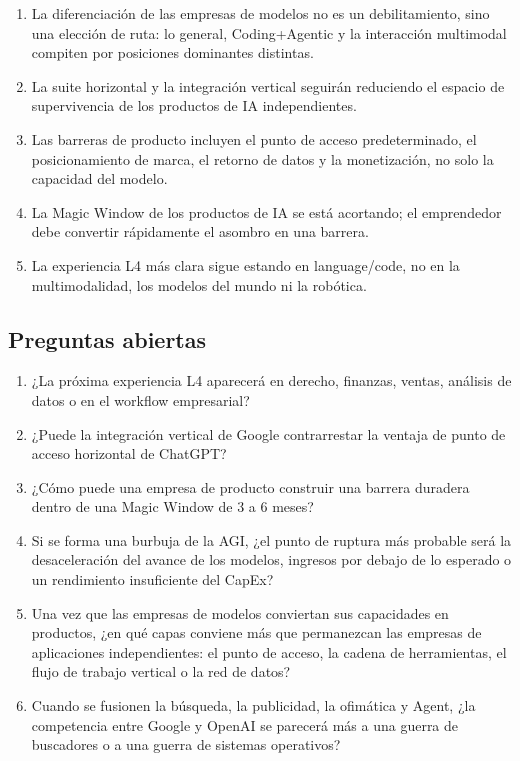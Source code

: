 \begin{enumerate}
\item La diferenciación de las empresas de modelos no es un debilitamiento, sino una elección de ruta: lo general, Coding+Agentic y la interacción multimodal compiten por posiciones dominantes distintas.
\item La suite horizontal y la integración vertical seguirán reduciendo el espacio de supervivencia de los productos de IA independientes.
\item Las barreras de producto incluyen el punto de acceso predeterminado, el posicionamiento de marca, el retorno de datos y la monetización, no solo la capacidad del modelo.
\item La Magic Window de los productos de IA se está acortando; el emprendedor debe convertir rápidamente el asombro en una barrera.
\item La experiencia L4 más clara sigue estando en language/code, no en la multimodalidad, los modelos del mundo ni la robótica.
\end{enumerate}

\subsection{Preguntas abiertas}

\begin{enumerate}
\item ¿La próxima experiencia L4 aparecerá en derecho, finanzas, ventas, análisis de datos o en el workflow empresarial?
\item ¿Puede la integración vertical de Google contrarrestar la ventaja de punto de acceso horizontal de ChatGPT?
\item ¿Cómo puede una empresa de producto construir una barrera duradera dentro de una Magic Window de 3 a 6 meses?
\item Si se forma una burbuja de la AGI, ¿el punto de ruptura más probable será la desaceleración del avance de los modelos, ingresos por debajo de lo esperado o un rendimiento insuficiente del CapEx?
\item Una vez que las empresas de modelos conviertan sus capacidades en productos, ¿en qué capas conviene más que permanezcan las empresas de aplicaciones independientes: el punto de acceso, la cadena de herramientas, el flujo de trabajo vertical o la red de datos?
\item Cuando se fusionen la búsqueda, la publicidad, la ofimática y Agent, ¿la competencia entre Google y OpenAI se parecerá más a una guerra de buscadores o a una guerra de sistemas operativos?
\end{enumerate}

